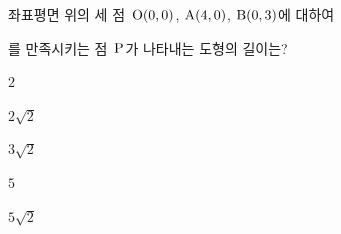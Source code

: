 좌표평면 위의 세 점~$\mathrm{O}(0{,}\mkern3mu\mathopen{}0)$, $\mathrm{A}(4{,}\mkern3mu\mathopen{}0)$, $\mathrm{B}(0{,}\mkern3mu\mathopen{}3)$에 대하여\par\smallskip{}\par\smallskip\noindent 를 만족시키는 점~$\mathrm{P}$가 나타내는 도형의 길이는?
\begin{choices32}{\rule[-3ex]{0pt}{8ex}$2$}{\rule[-3ex]{0pt}{8ex}$2\sqrt{2}$}{\rule[-3ex]{0pt}{8ex}$3\sqrt{2}$}{\rule[-3ex]{0pt}{8ex}$5$}{\rule[-3ex]{0pt}{8ex}$5\sqrt{2}$}\end{choices32}
